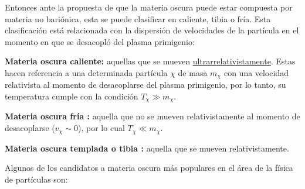 Entonces ante la propuesta de que la materia oscura puede estar compuesta por materia no bariónica, esta se puede clasificar en caliente, tibia o fría. Esta clasificación está relacionada con la dispersión de velocidades de la partícula en el momento en que se desacopló del plasma primigenio:
\begin{itemize_f}
\item \textbf{Materia oscura caliente: } aquellas que se mueven \href{https://en.wikipedia.org/wiki/Ultrarelativistic_limit}{ultrarrelativistamente}. Estas hacen referencia a una determinada partícula $\chi$ de masa $m_\chi$ con una velocidad relativista al momento de desacoplarse del plasma primigenio, por lo tanto, su temperatura cumple con la condición $T_\chi \gg m_\chi$. 

\item \textbf{Materia oscura fría :} aquella que no se mueven relativistamente al momento de desacoplarse ($v_\chi \sim 0$), por lo cual $T_\chi \ll m_\chi$. 

\item \textbf{Materia oscura templada o tibia :} aquella que se mueven relativistamente. %
\end{itemize_f}

Algunos de los candidatos a materia oscura más populares en el área de la física de partículas son: 


